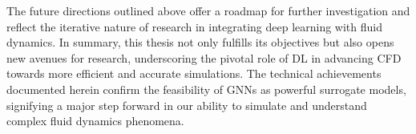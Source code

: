 The future directions outlined above offer a roadmap for further investigation and reflect the iterative nature of research in integrating deep learning with fluid dynamics. In summary, this thesis not only fulfills its objectives but also opens new avenues for research, underscoring the pivotal role of DL in advancing CFD towards more efficient and accurate simulations. The technical achievements documented herein confirm the feasibility of GNNs as powerful surrogate models, signifying a major step forward in our ability to simulate and understand complex fluid dynamics phenomena.



